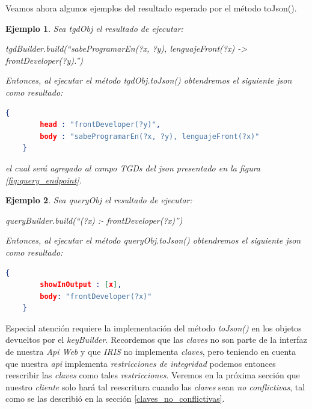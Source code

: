 \documentclass[11pt,a4paper,twoside]{tesis}
\newtheorem{exmp}{Ejemplo}
\begin{document}
Veamos ahora algunos ejemplos del resultado esperado por el método toJson().

\begin{exmp}
Sea \textit{tgdObj} el resultado de ejecutar:

\begin{center}
   \textit{tgdBuilder.build(``sabeProgramarEn(?x, ?y), lenguajeFront(?x) ->  frontDeveloper(?y).'')} 
\end{center}

Entonces, al ejecutar el método \textit{tgdObj.toJson()} obtendremos el siguiente \textit{json} como resultado:


\begin{lstlisting}[language=json,firstnumber=1]
    {
        head : "frontDeveloper(?y)",
        body : "sabeProgramarEn(?x, ?y), lenguajeFront(?x)"
    }
\end{lstlisting}

el cual será agregado al campo \textit{TGDs} del \textit{json} presentado en la figura \ref{fig:query_endpoint}.

\end{exmp}

\begin{exmp}
Sea \textit{queryObj} el resultado de ejecutar:

\begin{center}
   \textit{queryBuilder.build(``(?x) :- frontDeveloper(?x)'')} 
\end{center}

Entonces, al ejecutar el método \textit{queryObj.toJson()} obtendremos el siguiente \textit{json} como resultado:


\begin{lstlisting}[language=json,firstnumber=1]
    {
        showInOutput : [x],
        body: "frontDeveloper(?x)"
    }
\end{lstlisting}
\end{exmp}

Especial atención requiere la implementación del método \textit{toJson()} en los objetos devueltos por el \textit{keyBuilder}. Recordemos que las \textit{claves} no son parte de la interfaz de nuestra \textit{Api Web} y que \textit{IRIS} no implementa \textit{claves}, pero teniendo en cuenta que nuestra \textit{api} implementa \textit{restricciones de integridad} podemos entonces reescribir las \textit{claves} como tales \textit{restricciones}. Veremos en la próxima sección que nuestro \textit{cliente} solo hará tal reescritura cuando las \textit{claves} sean \textit{no conflictivas}, tal como se las describió en la sección \ref{claves_no_conflictivas}. 
\end{document}
